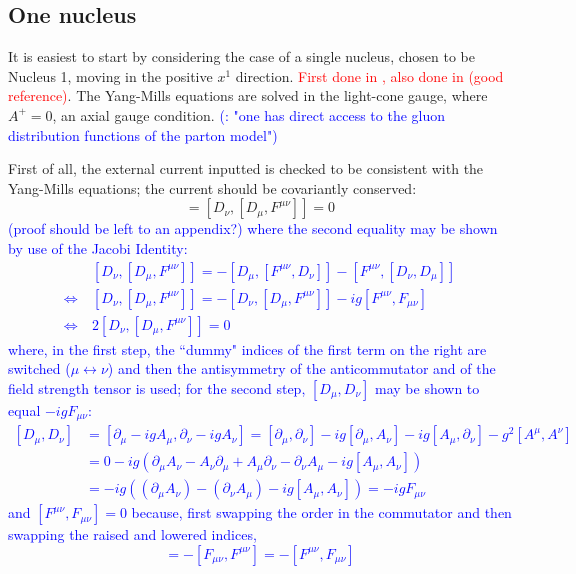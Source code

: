 \subsection{One nucleus}
It is easiest to start by considering the case of a single nucleus, chosen to be Nucleus 1, moving in the positive $x^1$ direction. \textcolor{red}{First done in \cite{}, also done in \cite{} (good reference)}. The Yang-Mills equations are solved in the light-cone gauge, where $A^+=0$, an axial gauge condition. \textcolor{blue}{(\citep{Kovner_1995}: "one has direct access to the gluon distribution functions of the parton model")}

First of all, the external current inputted is checked to be consistent with the Yang-Mills equations; the current should be covariantly conserved:
\begin{equation}
	[D_\nu, J^\nu] = [D_\nu, [D_\mu, F^{\mu \nu}]] = 0
	\label{eq:covariant_conservation}
\end{equation}
\textcolor{blue}{ (proof should be left to an appendix?) where the second equality may be shown by use of the Jacobi Identity:
\begin{equation}
\begin{split}
	& [D_\nu, [D_\mu, F^{\mu \nu}]] = - [D_\mu, [F^{\mu \nu}, D_\nu]] - [F^{\mu \nu}, [D_\nu, D_\mu]] \\
	\Leftrightarrow ~ & [D_\nu, [D_\mu, F^{\mu \nu}]] = - [D_\nu, [D_\mu, F^{\mu \nu}]] - ig [F^{\mu \nu}, F_{\mu \nu}]
	\\
	\Leftrightarrow ~ & 2 [D_\nu, [D_\mu, F^{\mu \nu}]] = 0
\end{split}
\end{equation}
where, in the first step, the ``dummy" indices of the first term on the right are switched ($\mu 	\leftrightarrow \nu$) and then the antisymmetry of the anticommutator and of the field strength tensor is used; for the second step, $[D_\mu, D_\nu]$ may be shown to equal $-ig F_{\mu \nu}$:
\begin{equation} 
\begin{split}
	[D_\mu, D_\nu] & = [\partial_\mu - i g A_\mu, \partial_\nu - i g A_\nu] = [\partial_\mu, \partial_\nu] - ig [\partial_\mu, A_\nu] - i g [A_\mu, \partial_\nu] - g^2 [A^\mu, A^\nu] \\
	& =  0 - ig \left( \partial_\mu A_\nu -  A_\nu \partial_\mu + A_\mu \partial_\nu  - \partial_\nu A_\mu - ig [A_\mu, A_\nu] \right) \\
	& = -ig \left( (\partial_\mu A_\nu) - (\partial_\nu A_\mu) - ig [A_\mu, A_\nu] \right) = -ig F_{\mu\nu} 
\end{split}
\end{equation}
and $[F^{\mu\nu}, F_{\mu\nu}] = 0$ because, first swapping the order in the commutator and then swapping the raised and lowered indices,
\begin{equation}
	[F^{\mu\nu}, F_{\mu\nu}] = -[F_{\mu\nu}, F^{\mu\nu}] = - [F^{\mu\nu}, F_{\mu\nu}]
\end{equation}}

